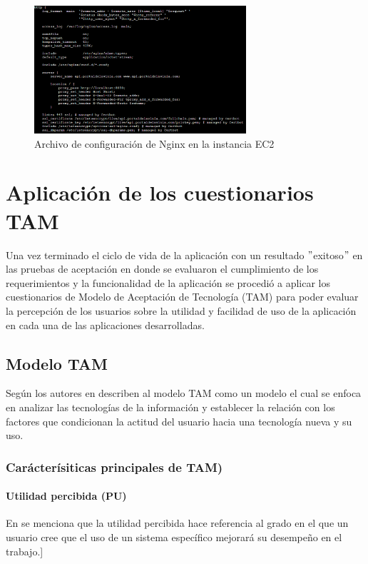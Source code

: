 \begin{figure}[H]
    \centering
    \includegraphics[width=0.7\textwidth]{resources/images/aws-nginx-config}
    \caption{Archivo de configuración de Nginx en la instancia EC2}
    \label{fig:nginx-config}
\end{figure}

\section{Aplicación de los cuestionarios TAM}\label{sec:aplicacion-de-los-cuestionarios-tam}

Una vez terminado el ciclo de vida de la aplicación con un resultado \("\)exitoso\("\) en las pruebas de aceptación en donde se evaluaron el cumplimiento de los requerimientos y la funcionalidad de la aplicación se procedió a aplicar los cuestionarios de Modelo de Aceptación de Tecnología (TAM) para poder evaluar la percepción de los usuarios sobre la utilidad y facilidad de uso de la aplicación en cada una de las aplicaciones desarrolladas.
\subsection{Modelo TAM}\label{subsec:modelo-tam}

Según los autores en \cite{tapia_leon_comparacion_2015} describen al modelo TAM como un modelo el cual se enfoca en analizar las tecnologías de la información y establecer la relación con los factores que condicionan la actitud del usuario hacia una tecnología nueva y su uso.
\subsubsection{Carácterísiticas principales de TAM)}\label{subsubsec:utilidad-percibida}
\paragraph{Utilidad percibida (PU)}
En \cite{varela_modelo_2010} se menciona que la utilidad percibida hace referencia al grado en el que un usuario cree que el uso de un sistema específico mejorará su desempeño en el trabajo.]
